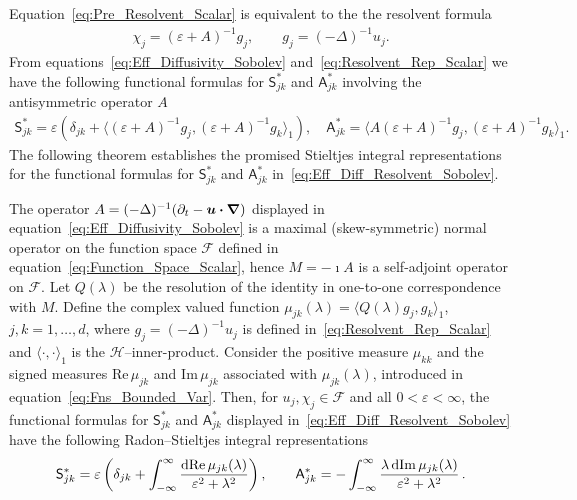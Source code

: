 \documentclass[leqno,onefignum,onetabnum]{siamltex1213}
\renewcommand{\d}{\mathrm{d}}
\newcommand\Real{\mbox{Re}\,} %
\newcommand\Imag{\mbox{Im}\,} %
\newcommand{\Sm}{\mathsf{S}}
\newcommand{\Am}{\mathsf{A}}
\newcommand{\Hs}{\mathscr{H}}
\newcommand{\Fs}{\mathscr{F}}
\newcommand\bnabla{\mbox{\boldmath${\nabla}$}}
\providecommand\bcdot{\boldsymbol{\cdot}}
\newcommand{\vecu}{\boldsymbol{u}}
\begin{document}
Equation~\eqref{eq:Pre_Resolvent_Scalar}   
is equivalent to the the resolvent formula
%
\begin{align}\label{eq:Resolvent_Rep_Scalar}
  \chi_j=(\varepsilon+A)^{-1}g_j, \qquad 
  g_j=(-\Delta)^{-1}u_j.
\end{align}
%
From equations~\eqref{eq:Eff_Diffusivity_Sobolev}
and~\eqref{eq:Resolvent_Rep_Scalar} we have the following functional
formulas for $\Sm^*_{jk}$ and $\Am^*_{jk}$ involving the antisymmetric
operator $A$
%
\begin{align}\label{eq:Eff_Diff_Resolvent_Sobolev}
 \Sm^*_{jk}=\varepsilon\left(\delta_{jk}
  +\langle(\varepsilon+A)^{-1}g_j,(\varepsilon+A)^{-1}g_k\rangle_1\right), 
  \quad
 \Am^*_{jk}=\langle A(\varepsilon+A)^{-1}g_j,(\varepsilon+A)^{-1}g_k\rangle_1.
\end{align}
%
The following theorem establishes the promised Stieltjes integral
representations for the functional formulas for $\Sm^*_{jk}$ and $\Am^*_{jk}$
in~\eqref{eq:Eff_Diff_Resolvent_Sobolev}.  
%
\begin{theorem}\label{thm:Integral_Reps}
  The operator $A=(-\Delta)^{-1}(\partial_t-\vecu\bcdot\bnabla)$ displayed in
  equation~\eqref{eq:Eff_Diffusivity_Sobolev} is a maximal
  (skew-symmetric) normal operator on the function space $\Fs$ defined
  in equation~\eqref{eq:Function_Space_Scalar}, hence $M=-\imath A$ is a
  self-adjoint operator on $\Fs$. Let $Q(\lambda)$ be the resolution of the
  identity in one-to-one correspondence with $M$. Define the complex
  valued   function $\mu_{jk}(\lambda)=\langle Q(\lambda)g_j,g_k\rangle_1$, $j,k=1,\ldots,d$, where
  $g_j=(-\Delta)^{-1}u_j$ is defined in~\eqref{eq:Resolvent_Rep_Scalar} and 
  $\langle\cdot,\cdot\rangle_1$ is the $\Hs$--inner-product. Consider the positive measure
  $\mu_{kk}$ and the signed measures $\Real\mu_{jk}$ and $\Imag\mu_{jk}$
  associated with $\mu_{jk}(\lambda)$, introduced in
  equation~\eqref{eq:Fns_Bounded_Var}.  Then, for $u_j,\chi_j\in\Fs$
  and all $0<\varepsilon<\infty$,
  the functional formulas for $\Sm^*_{jk}$ and $\Am^*_{jk}$ displayed
  in~\eqref{eq:Eff_Diff_Resolvent_Sobolev} have the following
  Radon--Stieltjes integral representations
  \begin{align}\label{eq:Integral_Rep_kappa*}
    \Sm^*_{jk}=\varepsilon\left(\delta_{jk}+\int_{-\infty}^\infty\frac{\d{\rm Re}\,\mu_{jk}(\lambda)}{\varepsilon^2+\lambda^2}\right),
    \qquad
    \Am^*_{jk}=-\int_{-\infty}^\infty\frac{\lambda\,\d{\rm Im}\,\mu_{jk}(\lambda)}{\varepsilon^2+\lambda^2}\,.         
\end{align}
% 
\end{theorem}
\end{document}
